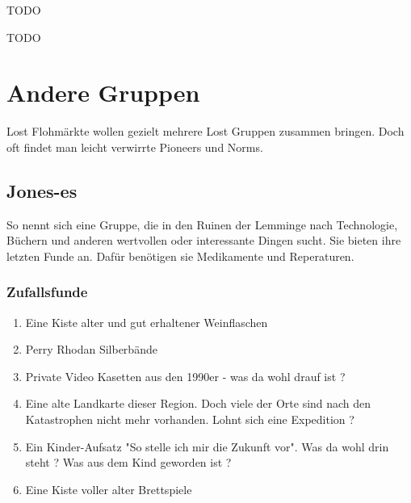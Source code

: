 \begin{npcBox}[title=Flash]
    \begin{consequences}
    \item {}
    \item {}
    \item {}
    \end{consequences}

    \begin{npcDescription}
    TODO
    \end{npcDescription}


    \begin{equipment}
    \item TODO
    \end{equipment}
\end{npcBox}
\newpage

\chapter{Andere Gruppen}

Lost Flohmärkte wollen gezielt mehrere Lost Gruppen zusammen bringen. Doch oft findet man leicht verwirrte Pioneers und Norms.

\section{Jones-es}

So nennt sich eine Gruppe, die in den Ruinen der Lemminge nach Technologie, Büchern und anderen wertvollen oder interessante Dingen sucht. Sie bieten ihre letzten Funde an. Dafür benötigen sie Medikamente und Reperaturen.

\subsection{Zufallsfunde}

\begin{enumerate}
    \item Eine Kiste alter und gut erhaltener Weinflaschen
    \item Perry Rhodan Silberbände
    \item Private Video Kasetten aus den 1990er - was da wohl drauf ist ?
    \item Eine alte Landkarte dieser Region. Doch viele der Orte sind nach den Katastrophen nicht mehr vorhanden. Lohnt sich eine Expedition ?
    \item Ein Kinder-Aufsatz "So stelle ich mir die Zukunft vor". Was da wohl drin steht ? Was aus dem Kind geworden ist ?
    \item Eine Kiste voller alter Brettspiele
\end{enumerate}

